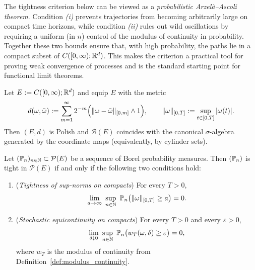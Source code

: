 \medskip
The tightness criterion below can be viewed as a \emph{probabilistic Arzel\`a--Ascoli theorem}.
Condition \emph{(i)} prevents trajectories from becoming arbitrarily large on compact time horizons,
while condition \emph{(ii)} rules out wild oscillations by requiring a uniform (in $n$) control of
the modulus of continuity in probability.  Together these two bounds ensure that, with high probability,
the paths lie in a compact subset of $C([0,\infty);\mathbb{R}^d)$.
This makes the criterion a practical tool for proving weak convergence of processes and is the standard
starting point for functional limit theorems.

\begin{theorem}\label{thm:tightness_C0infty}
Let $E:=C([0,\infty);\mathbb{R}^d)$ and equip $E$ with the metric
\[
d(\omega,\tilde\omega)
:=\sum_{m=1}^\infty 2^{-m}\Bigl(\|\omega-\tilde\omega\|_{[0,m]}\wedge 1\Bigr),
\qquad
\|\omega\|_{[0,T]}:=\sup_{t\in[0,T]}|\omega(t)|.
\]
Then $(E,d)$ is Polish and $\mathcal{B}(E)$ coincides with the canonical $\sigma$-algebra
generated by the coordinate maps (equivalently, by cylinder sets).

Let $(\mathbb{P}_n)_{n\in\mathbb{N}}\subset\mathcal{P}(E)$ be a sequence of Borel probability measures.
Then $(\mathbb{P}_n)$ is tight in $\mathcal{P}(E)$ if and only if the following two conditions hold:
\begin{enumerate}[label=\textnormal{(\roman*)}, leftmargin=3.2em]
\item (\emph{Tightness of sup-norms on compacts}) For every $T>0$,
\[
\lim_{a\to\infty}\ \sup_{n\in\N}\ \Pp_n\bigl(\|\omega\|_{[0,T]}\ge a\bigr)=0.
\]
\item (\emph{Stochastic equicontinuity on compacts}) For every $T>0$ and every $\varepsilon>0$,
\[
\lim_{\delta\downarrow 0}\ \sup_{n\in\N}\ \Pp_n\bigl(w_T(\omega,\delta)\ge \varepsilon\bigr)=0,
\]
where $w_T$ is the modulus of continuity from Definition~\ref{def:modulus_continuity}.
\end{enumerate}
\end{theorem}



